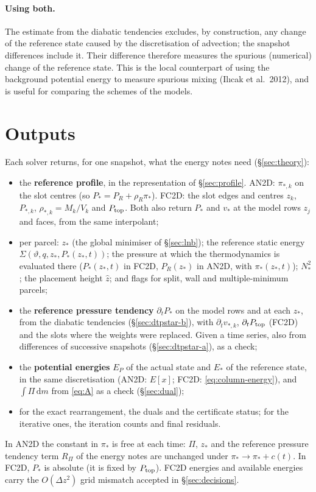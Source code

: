 \documentclass[11pt,a4paper]{article}
\newcommand{\vt}{\vartheta}
\newcommand{\Ptop}{P_{\rm top}}
\newcommand{\zs}{z_{*}}
\newcommand{\zh}{\hat z}
\begin{document}
\paragraph{Using both.} The estimate from the diabatic tendencies excludes, by construction, any change of the reference state
caused by the discretisation of advection; the snapshot differences include it. Their difference therefore measures the
spurious (numerical) change of the reference state.
This is the local counterpart of using the background potential energy to measure spurious mixing (Il{\i}cak et al.\ 2012),
and is useful for comparing the schemes of the models.

\section{Outputs}\label{sec:outputs}
Each solver returns, for one snapshot, what the energy notes need (\S\ref{sec:theory}):
\begin{itemize}
  \item the \textbf{reference profile}, in the representation of \S\ref{sec:profile}. AN2D: $\pi_{*,k}$ on the slot centres (so
        $P_*=P_R+\rho_R\pi_*$). FC2D: the slot edges and centres $z_k$, $P_{*,k}$, $\rho_{*,k}=M_k/V_k$ and $\Ptop$. Both also
        return $P_*$ and $v_*$ at the model rows $z_j$ and faces, from the same interpolant;
  \item per parcel: $\zs$ (the global minimiser of \S\ref{sec:lnb}); the reference static energy
        $\Sigma(\vt,q,\zs,P_*(\zs,t))$; the pressure at which the thermodynamics is evaluated there ($P_*(\zs,t)$ in FC2D,
        $P_R(\zs)$ in AN2D, with $\pi_*(\zs,t)$); $N_*^2$; the placement height $\zh$; and flags for split, wall and
        multiple-minimum parcels;
  \item the \textbf{reference pressure tendency} $\partial_tP_*$ on the model rows and at each $\zs$, from the diabatic
        tendencies (\S\ref{sec:dtpstar-b}), with $\partial_tv_{*,k}$, $\partial_t\Ptop$ (FC2D) and the slots where the weights
        were replaced. Given a time series, also from differences of successive snapshots (\S\ref{sec:dtpstar-a}), as a
        check;
  \item the \textbf{potential energies} $E_P$ of the actual state and $E_*$ of the reference state, in the same
        discretisation (AN2D: $E[x]$; FC2D: \eqref{eq:column-energy}), and $\int\Pi\,\mathrm{d}m$ from \eqref{eq:A} as a check
        (\S\ref{sec:dual});
  \item for the exact rearrangement, the duals and the certificate status; for the iterative ones, the iteration counts and
        final residuals.
\end{itemize}
In AN2D the constant in $\pi_*$ is free at each time: $\Pi$, $\zs$ and the reference pressure tendency term $R_\Pi$ of the energy
notes are unchanged under $\pi_*\to\pi_*+c(t)$. In FC2D, $P_*$ is absolute (it is fixed by $\Ptop$). FC2D energies and available energies carry the $O(\Delta z^2)$ grid mismatch accepted in
\S\ref{sec:decisions}.
\end{document}
